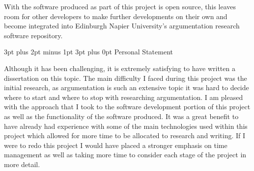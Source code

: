 \documentclass[12pt,a4paper]{article}
\makeatletter
\renewcommand\subsection{\@startsection {subsection}{1}{2mm} %
                               {3pt plus 2pt minus 1pt} %
                               {3pt plus 0pt} %
                               {\normalfont\bfseries}}
\makeatother
\begin{document}
With the software produced as part of this project is open source, this leaves room for other developers to make further developments on their own and become integrated into Edinburgh Napier University's argumentation research software repository.

\subsection{Personal Statement}

Although it has been challenging, it is extremely satisfying to have written a dissertation on this topic. The main difficulty I faced during this project was the initial research, as argumentation is such an extensive topic it was hard to decide where to start and where to stop with researching argumentation. I am pleased with the approach that I took to the software development portion of this project as well as the functionality of the software produced. It was a great benefit to have already had experience with some of the main technologies used within this project which allowed for more time to be allocated to research and writing. If I were to redo this project I would have placed a stronger emphasis on time management as well as taking more time to consider each stage of the project in more detail.
\end{document}
